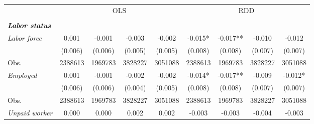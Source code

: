 

\begin{tabular}{lcccccccc}

\toprule

\multicolumn{1}{l}{} &  \multicolumn{4}{c}{OLS}  &
						\multicolumn{4}{c}{RDD}  \\


\cmidrule(l{1mm}r{1mm}){2-5} \cmidrule(l{1mm}r{1mm}){6-9} \\


\midrule

\multicolumn{9}{l}{\textit{\bf Labor status}}   \\  


\textit{Labor force}   &  0.001   &
						   -0.001   &
						   -0.003   &
						   -0.002   &
						   -0.015*   &
						   -0.017**   &
						   -0.010   &
						   -0.012   \\
						   
						&   \tiny{(0.006)}   &
						    \tiny{(0.006)}   &
						    \tiny{(0.005)}   &
						    \tiny{(0.005)}   &
						    \tiny{(0.008)}   &
						    \tiny{(0.008)}   &
						    \tiny{(0.007)}   &
						    \tiny{(0.007)}   \\

Obs.					&	\tiny{2388613}   &
						    \tiny{1969783}   &
						    \tiny{3828227}   &
						    \tiny{3051088}   &
						    \tiny{2388613}   &
						    \tiny{1969783}   &
						    \tiny{3828227}   &
						    \tiny{3051088}   \\

\textit{Employed}   &  0.001   &
						   -0.001   &
						   -0.002   &
						   -0.002   &
						   -0.014*   &
						   -0.017**   &
						   -0.009   &
						   -0.012*   \\
						   
						&   \tiny{(0.006)}   &
						    \tiny{(0.006)}   &
						    \tiny{(0.004)}   &
						    \tiny{(0.005)}   &
						    \tiny{(0.008)}   &
						    \tiny{(0.008)}   &
						    \tiny{(0.007)}   &
						    \tiny{(0.007)}   \\
						
Obs.					&	\tiny{2388613}   &
						    \tiny{1969783}   &
						    \tiny{3828227}   &
						    \tiny{3051088}   &
						    \tiny{2388613}   &
						    \tiny{1969783}   &
						    \tiny{3828227}   &
						    \tiny{3051088}   \\



\textit{Unpaid worker}   &  0.000   &
						   0.000   &
						   0.002   &
						   0.002   &
						   -0.003   &
						   -0.003   &
						   -0.004   &
						   -0.003   \\
						   

\end{tabular}
